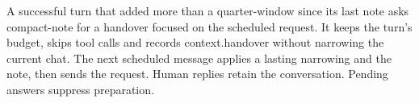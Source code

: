 A successful turn that added more than a quarter-window since its last note
asks compact-note for a handover focused on the scheduled request. It keeps
the turn's budget, skips tool calls and records context.handover without
narrowing the current chat. The next scheduled message applies a lasting
narrowing and the note, then sends the request. Human replies retain the
conversation. Pending answers suppress preparation.
